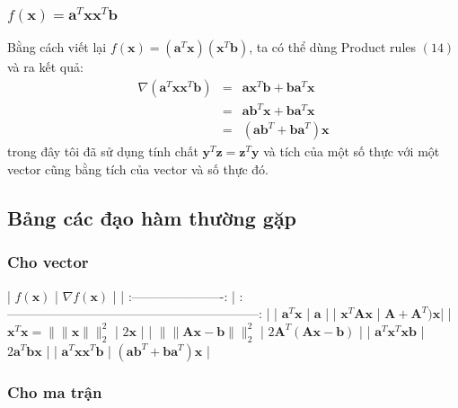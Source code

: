 \subsubsection{$f(\mathbf{x}) = \mathbf{a}^T\mathbf{x}\mathbf{x}^T\mathbf{b}$}
Bằng cách viết lại $f(\mathbf{x}) = (\mathbf{a}^T\mathbf{x})(\mathbf{x}^T\mathbf{b})$, ta có thể dùng Product rules $(14)$ và ra kết quả:  
\begin{eqnarray} 
\nabla (\mathbf{a}^T\mathbf{x}\mathbf{x}^T\mathbf{b}) &=& \mathbf{a} \mathbf{x}^T\mathbf{b} +  \mathbf{b}\mathbf{a}^T\mathbf{x} \\\ 
&=& \mathbf{ab}^T\mathbf{x} + \mathbf{b}\mathbf{a}^T\mathbf{x}\\\ 
&=& (\mathbf{ab}^T + \mathbf{ba}^T)\mathbf{x} 
\end{eqnarray} 
trong đây tôi đã sử dụng tính chất $\mathbf{y}^T\mathbf{z} = \mathbf{z}^T\mathbf{y}$ và tích của một số thực với một vector cũng bằng tích của vector và số thực đó.  
 
 
\subsection{Bảng các đạo hàm thường gặp}
 
\subsubsection{Cho vector }
 
| $f(\mathbf{x}) $           | $ \nabla f(\mathbf{x}) $     |          
| :----------------------:       | :------------------------------------------------------------: |          
| $\mathbf{a}^T \mathbf{x} $ | $\mathbf{a}$                                               |   
| $\mathbf{x}^T\mathbf{Ax}$  | $\mathbf{A} + \mathbf{A}^T) \mathbf{x}$|        
| $\mathbf{x}^T \mathbf{x} =  \| \|\mathbf{x} \|\|_2^2 $  | $2\mathbf{x}  $     | 
| $ \|\|\mathbf{Ax-b} \|\|_2^2 $  | $ 2\mathbf{A}^T (\mathbf{Ax - b})$      |          
| $\mathbf{a}^T\mathbf{x}^T\mathbf{xb} $ |  $2\mathbf{a}^T\mathbf{bx} $ | 
| $\mathbf{a}^T\mathbf{x}\mathbf{x}^T\mathbf{b} $ |  $ (\mathbf{a}\mathbf{b}^T + \mathbf{b}\mathbf{a}^T) \mathbf{x} $ | 
 
 
\subsubsection{Cho ma trận}
 
